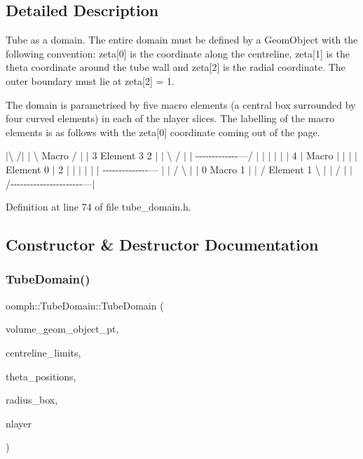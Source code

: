 \subsection{Detailed Description}
Tube as a domain. The entire domain must be defined by a Geom\+Object with the following convention\+: zeta\mbox{[}0\mbox{]} is the coordinate along the centreline, zeta\mbox{[}1\mbox{]} is the theta coordinate around the tube wall and zeta\mbox{[}2\mbox{]} is the radial coordinate. The outer boundary must lie at zeta\mbox{[}2\mbox{]} = 1. 

The domain is parametrised by five macro elements (a central box surrounded by four curved elements) in each of the nlayer slices. The labelling of the macro elements is as follows with the zeta\mbox{[}0\mbox{]} coordinate coming out of the page. 

 $\vert$\textbackslash{} /$\vert$ $\vert$ \textbackslash{} Macro / $\vert$ $\vert$ 3 Element 3 2 $\vert$ $\vert$ \textbackslash{} / $\vert$ $\vert$ -\/-\/-\/-\/-\/-\/-\/-\/-\/-\/-\/-\/-\/---/ $\vert$ $\vert$ $\vert$ $\vert$ $\vert$ $\vert$ 4 $\vert$ Macro $\vert$ $\vert$ $\vert$ $\vert$ Element 0 $\vert$ 2 $\vert$ $\vert$ $\vert$ $\vert$ $\vert$ $\vert$ -\/-\/-\/-\/-\/-\/-\/-\/-\/-\/-\/-\/-\/-\/--- $\vert$ $\vert$ / \textbackslash{} $\vert$ $\vert$ 0 Macro 1 $\vert$ $\vert$ / Element 1 \textbackslash{} $\vert$ $\vert$ / $|$ $\vert$/-\/-\/-\/-\/-\/-\/-\/-\/-\/-\/-\/-\/-\/-\/-\/-\/-\/-\/-\/-\/-\/-\/---$\vert$ 

Definition at line 74 of file tube\+\_\+domain.\+h.



\subsection{Constructor \& Destructor Documentation}
\mbox{\label{classoomph_1_1TubeDomain_a025d462a0676026e5902d07ffbb3510e}} 
\subsubsection{\texorpdfstring{Tube\+Domain()}{TubeDomain()}\hspace{0.1cm}{\footnotesize\ttfamily [1/2]}}
{\footnotesize\ttfamily oomph\+::\+Tube\+Domain\+::\+Tube\+Domain (\begin{DoxyParamCaption}\item[{Geom\+Object $\ast$}]{volume\+\_\+geom\+\_\+object\+\_\+pt,  }\item[{const Vector$<$ double $>$ \&}]{centreline\+\_\+limits,  }\item[{const Vector$<$ double $>$ \&}]{theta\+\_\+positions,  }\item[{const Vector$<$ double $>$ \&}]{radius\+\_\+box,  }\item[{const unsigned \&}]{nlayer }\end{DoxyParamCaption})\hspace{0.3cm}{\ttfamily [inline]}}




